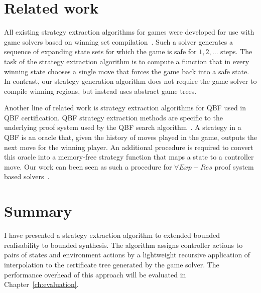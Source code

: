 \section{Related work}

All existing strategy extraction algorithms for games were developed for use with game solvers based on winning set compilation~\cite{Bloem14}.  Such a solver generates a sequence of expanding state sets for which the game is safe for $1,2,\ldots$ steps.  The task of the strategy extraction algorithm is to compute a function that in every winning state chooses a single move that forces the game back into a safe state.  In contrast, our strategy generation algorithm does not require the game solver to compile winning regions, but instead uses abstract game trees.

Another line of related work is strategy extraction algorithms for QBF used in QBF certification. QBF strategy extraction methods are specific to the underlying proof system used by the QBF search algorithm~\cite{Lonsing10,Egly13,Goultiaeva11}.  A strategy in a QBF is an oracle that, given the history of moves played in the game, outputs the next move for the winning player.  An additional procedure is required to convert this oracle into a memory-free strategy function that maps a state to a controller move.  Our work can been seen as such a procedure for $\forall Exp+Res$ proof system based solvers~\cite{Janota13}.

\section{Summary}

I have presented a strategy extraction algorithm to extended bounded realisability to bounded synthesis. The algorithm assigns controller actions to pairs of states and environment actions by a lightweight recursive application of interpolation to the certificate tree generated by the game solver. The performance overhead of this approach will be evaluated in Chapter~\ref{ch:evaluation}.
